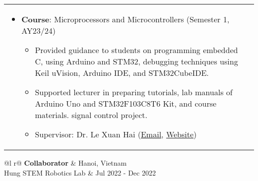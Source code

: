 \documentclass[a4paper,11pt]{article}
\begin{document}
\begin{tabularx}{\linewidth}{ @{}l r@{} }
{\begin{minipage}[t]{\linewidth}
\begin{itemize}[nosep,after=\strut, leftmargin=1em, itemsep=3pt]
        \item \textbf{Course}: Microprocessors and Microcontrollers (Semester 1, AY23/24)
        \begin{itemize}
            \item Provided guidance to students on programming embedded C, using Arduino and STM32, debugging techniques using Keil uVision, Arduino IDE, and STM32CubeIDE.
            \item Supported lecturer in preparing tutorials, lab manuals of Arduino Uno and STM32F103C8T6 Kit, and course materials.
signal control project.
            \item Supervisor: Dr. Le Xuan Hai (\href{mailto:hailx@vnu.edu.vn}{\raisebox{-0.05\height}Email}, \href{https://www.is.vnu.edu.vn/en/phd-le-xuan-hai/}{\raisebox{-0.05\height}Website})
        \end{itemize}
    \end{itemize}
    \vspace{-0.2cm}
\end{minipage}
}
\end{tabularx}
\vspace{-0.2cm}
\begin{tabularx}{\linewidth}{ @{}l r@{} }
\textbf{Collaborator} & \hfill Hanoi, Vietnam \\[3.75pt]
Hung STEM Robotics Lab & \hfill Jul 2022 - Dec 2022 \\[3.75pt]
\end{tabularx}
\end{document}
